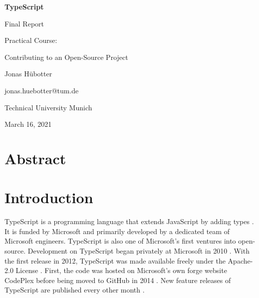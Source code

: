 \documentclass[12pt]{scrartcl}
\let\oldsection\section
\renewcommand\section{\clearpage\oldsection}
\begin{document}

\begin{titlepage}
    \begin{center}
        \vspace*{\fill}

        \Huge
        \textbf{TypeScript}

        \LARGE
        Final Report

        \vspace{0.5cm}
        \large
        Practical Course:\par
        Contributing to an Open-Source Project

        \vspace{5cm}

        Jonas Hübotter

        \small
        jonas.huebotter@tum.de

        \vspace{0.5cm}

        Technical University Munich

        March 16, 2021

        \vspace*{\fill}
    \end{center}
\end{titlepage}

\section{Abstract}

\tableofcontents{}

\section{Introduction}

TypeScript is a programming language that extends JavaScript by adding types \cite{Website}. It is funded by Microsoft and primarily developed by a dedicated team of Microsoft engineers. TypeScript is also one of Microsoft's first ventures into open-source. Development on TypeScript began privately at Microsoft in 2010 \cite{Tung2020}. With the first release in 2012, TypeScript was made available freely under the Apache-2.0 License \cite{Microsoft2014}. First, the code was hosted on Microsoft's own forge website CodePlex before being moved to GitHub in 2014 \cite{Turner2014}. New feature releases of TypeScript are published every other month \cite{Rosenwasser2017}.
\end{document}

